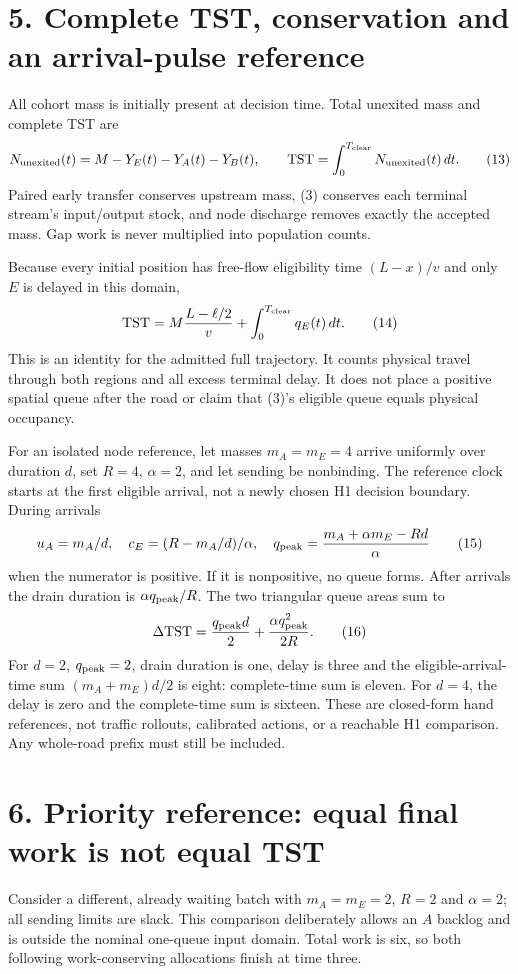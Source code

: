 \documentclass[11pt,a4paper]{article}
\begin{document}
\section*{5. Complete TST, conservation and an arrival-pulse reference}
All cohort mass is initially present at decision time. Total unexited mass
and complete TST are
\[
 N_{\rm unexited}(t)=M-Y_E(t)-Y_A(t)-Y_B(t),\qquad
 \mathrm{TST}=\int_0^{T_{\rm clear}}N_{\rm unexited}(t)\,dt.
 \tag{13}
\]
Paired early transfer conserves upstream mass, (3) conserves each terminal
stream's input/output stock, and node discharge removes exactly the accepted
mass. Gap work is never multiplied into population counts.

Because every initial position has free-flow eligibility time $(L-x)/v$
and only $E$ is delayed in this domain,
\[
 \mathrm{TST}=M\frac{L-\ell/2}{v}
                 +\int_0^{T_{\rm clear}}q_E(t)\,dt.
 \tag{14}
\]
This is an identity for the admitted full trajectory. It counts physical
travel through both regions and all excess terminal delay. It does not place
a positive spatial queue after the road or claim that (3)'s eligible queue
equals physical occupancy.

For an isolated node reference, let masses $m_A=m_E=4$ arrive uniformly over
duration $d$, set $R=4$, $\alpha=2$, and let sending be nonbinding. The
reference clock starts at the first eligible arrival, not a newly chosen
H1 decision boundary. During arrivals
\[
 u_A=m_A/d,\quad c_E=(R-m_A/d)/\alpha,\quad
 q_{\rm peak}=\frac{m_A+\alpha m_E-Rd}{\alpha}
 \tag{15}
\]
when the numerator is positive. If it is nonpositive, no queue forms.
After arrivals the drain duration is $\alpha q_{\rm peak}/R$. The two
triangular queue areas sum to
\[
 \Delta\mathrm{TST}=\frac{q_{\rm peak}d}{2}
              +\frac{\alpha q_{\rm peak}^2}{2R}.
 \tag{16}
\]
For $d=2$, $q_{\rm peak}=2$, drain duration is one, delay is three and the
eligible-arrival-time sum $(m_A+m_E)d/2$ is eight: complete-time sum is eleven.
For $d=4$, the delay is zero and the complete-time sum is sixteen. These are
closed-form hand references, not traffic rollouts, calibrated actions, or a
reachable H1 comparison. Any whole-road prefix must still be included.

\section*{6. Priority reference: equal final work is not equal TST}
Consider a different, already waiting batch with $m_A=m_E=2$, $R=2$ and
$\alpha=2$; all sending limits are slack. This comparison deliberately allows
an $A$ backlog and is outside the nominal one-queue input domain. Total work
is six, so both following work-conserving allocations finish at time three.
\end{document}
